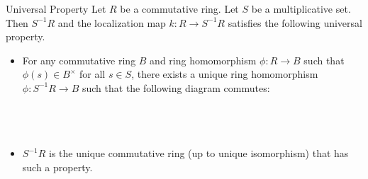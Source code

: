 \documentclass[a4paper]{article}
\begin{document}
\begin{prp}{Universal Property}{} Let $R$ be a commutative ring. Let $S$ be a multiplicative set. Then $S^{-1}R$ and the localization map $k:R\to S^{-1}R$ satisfies the following universal property. 
\begin{itemize}
\item For any commutative ring $B$ and ring homomorphism $\phi:R\to B$ such that $\phi(s)\in B^\times$ for all $s\in S$, there exists a unique ring homomorphism $\phi:S^{-1}R\to B$ such that the following diagram commutes: \\~\\
 \\~\\
\item $S^{-1}R$ is the unique commutative ring (up to unique isomorphism) that has such a property. 
\end{itemize}
\end{prp}
\end{document}
